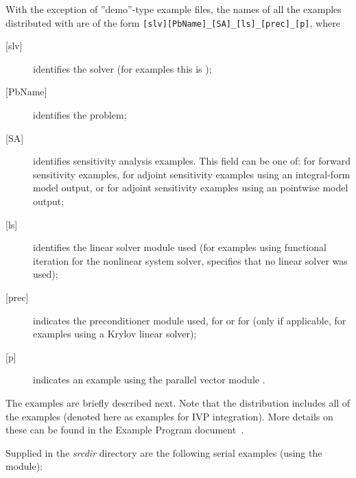 \vspace{0.2in}\noindent
With the exception of ''demo''-type example files, the names of all the examples 
distributed with {\sundials} are of the form \verb![slv][PbName]_[SA]_[ls]_[prec]_[p]!, 
where
\begin{description}
\item [{[slv]}] identifies the solver (for {\cvodes} examples this is );
\item [{[PbName]}] identifies the problem;
\item [{[SA]}] identifies sensitivity analysis examples. This field can be one
  of:  for forward sensitivity examples,  for adjoint sensitivity
  examples using an integral-form model output, or  for adjoint sensitivity
  examples using an pointwise model output;
\item [{[ls]}] identifies the linear solver module used (for examples using
  functional iteration for the nonlinear system solver,  specifies
  that no linear solver was used);
\item [{[prec]}] indicates the {\cvodes} preconditioner module used, 
   for {\cvbandpre} or  for {\cvbbdpre} 
  (only if applicable, for examples using a Krylov linear solver);
\item [{[p]}] indicates an example using the parallel vector module {\nvecp}.
\end{description}

\vspace{0.2in}\noindent
The examples are briefly described next.
Note that the {\cvodes} distribution includes all of the {\cvode} {\CC}
examples (denoted here as examples for IVP integration). More details on
these can be found in the {\cvode} Example Program document~\cite{cvode_ex}.


\vspace{0.2in}\noindent
Supplied in the {\em srcdir} directory are the
following serial examples (using the {\nvecs} module):

